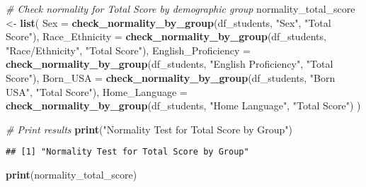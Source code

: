 \documentclass[
]{article}
\newenvironment{Shaded}{\begin{snugshade}}{\end{snugshade}}
\newcommand{\AttributeTok}[1]{\textcolor[rgb]{0.13,0.29,0.53}{#1}}
\newcommand{\CommentTok}[1]{\textcolor[rgb]{0.56,0.35,0.01}{\textit{#1}}}
\newcommand{\FunctionTok}[1]{\textcolor[rgb]{0.13,0.29,0.53}{\textbf{#1}}}
\newcommand{\NormalTok}[1]{#1}
\newcommand{\OtherTok}[1]{\textcolor[rgb]{0.56,0.35,0.01}{#1}}
\newcommand{\StringTok}[1]{\textcolor[rgb]{0.31,0.60,0.02}{#1}}
\begin{document}
\begin{Shaded}
\begin{Highlighting}[]
\CommentTok{\# Check normality for Total Score by demographic group}
\NormalTok{normality\_total\_score }\OtherTok{\textless{}{-}} \FunctionTok{list}\NormalTok{(}
  \AttributeTok{Sex =} \FunctionTok{check\_normality\_by\_group}\NormalTok{(df\_students, }\StringTok{"Sex"}\NormalTok{, }\StringTok{"Total Score"}\NormalTok{),}
  \AttributeTok{Race\_Ethnicity =} \FunctionTok{check\_normality\_by\_group}\NormalTok{(df\_students, }\StringTok{"Race/Ethnicity"}\NormalTok{, }\StringTok{"Total Score"}\NormalTok{),}
  \AttributeTok{English\_Proficiency =} \FunctionTok{check\_normality\_by\_group}\NormalTok{(df\_students, }\StringTok{"English Proficiency"}\NormalTok{, }\StringTok{"Total Score"}\NormalTok{),}
  \AttributeTok{Born\_USA =} \FunctionTok{check\_normality\_by\_group}\NormalTok{(df\_students, }\StringTok{"Born USA"}\NormalTok{, }\StringTok{"Total Score"}\NormalTok{),}
  \AttributeTok{Home\_Language =} \FunctionTok{check\_normality\_by\_group}\NormalTok{(df\_students, }\StringTok{"Home Language"}\NormalTok{, }\StringTok{"Total Score"}\NormalTok{)}
\NormalTok{)}
\end{Highlighting}
\end{Shaded}

\begin{Shaded}
\begin{Highlighting}[]
\CommentTok{\# Print results}
\FunctionTok{print}\NormalTok{(}\StringTok{"Normality Test for Total Score by Group"}\NormalTok{)}
\end{Highlighting}
\end{Shaded}

\begin{verbatim}
## [1] "Normality Test for Total Score by Group"
\end{verbatim}

\begin{Shaded}
\begin{Highlighting}[]
\FunctionTok{print}\NormalTok{(normality\_total\_score)}
\end{Highlighting}
\end{Shaded}
\end{document}
